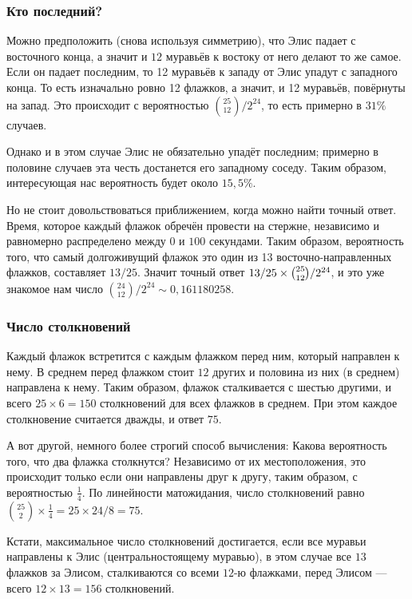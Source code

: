 \subsubsection*{Кто последний?}

Можно предположить (снова используя симметрию), что Элис падает с восточного конца,
а значит и $12$ муравьёв к востоку от него делают то же самое.
Если он падает последним, то 12 муравьёв к западу от Элис упадут с западного конца.
То есть изначально ровно 12 флажков, а значит, и 12 муравьёв, повёрнуты на запад.
Это происходит с вероятностью $\binom{25}{12}/2^{24}$, то есть примерно в $31\%$ случаев.

Однако и в этом случае Элис не обязательно упадёт последним;
примерно в половине случаев эта честь достанется его западному соседу.
Таким образом, интересующая нас вероятность будет около $15{,}5\%$.

Но не стоит довольствоваться приближением, когда можно найти точный ответ.
Время, которое каждый флажок обречён провести на стержне, независимо и равномерно распределено между $0$ и $100$ секундами.
Таким образом, вероятность того, что самый долгоживущий флажок это один из 13 восточно-направленных флажков, составляет $13/25$.
Значит точный ответ $13/25 \z\times\binom{25}{12}/2^{24}$, и это уже знакомое нам число $\binom{24}{12}/2^{24}\sim 0{,}161180258$.

\subsubsection*{Число столкновений}

Каждый флажок встретится с каждым флажком перед ним, который направлен к нему.
В среднем перед флажком стоит $12$ других и
половина из них (в среднем) направлена к нему.
Таким образом, флажок сталкивается с шестью другими, и всего $25 \times 6 = 150$ столкновений для всех флажков в среднем.
При этом каждое столкновение считается дважды, и ответ $75$.

А вот другой, немного более строгий способ вычисления:
Какова вероятность того, что два флажка столкнутся?
Независимо от их местоположения, это происходит только если они направлены друг к другу,
таким образом, с вероятностью $\tfrac14$.
По линейности матожидания, число столкновений равно $\binom{25}2 \times \tfrac14 = 25 \times 24 /8 = 75$.

Кстати, максимальное число столкновений достигается, если все муравьи направлены к Элис (центральностоящему муравью), в этом случае все $13$ флажков за Элисом, сталкиваются со всеми $12$-ю флажками, перед Элисом --- всего $12 \times 13 = 156$ столкновений.

